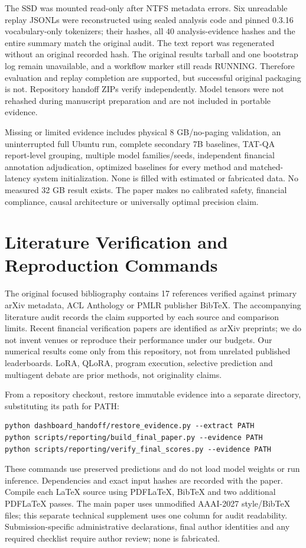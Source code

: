 \documentclass[letterpaper]{article}
\begin{document}
The SSD was mounted read-only after NTFS metadata errors. Six unreadable replay JSONLs were reconstructed using sealed analysis code and pinned 0.3.16 vocabulary-only tokenizers; their hashes, all 40 analysis-evidence hashes and the entire summary match the original audit. The text report was regenerated without an original recorded hash. The original results tarball and one bootstrap log remain unavailable, and a workflow marker still reads RUNNING. Therefore evaluation and replay completion are supported, but successful original packaging is not. Repository handoff ZIPs verify independently. Model tensors were not rehashed during manuscript preparation and are not included in portable evidence.

Missing or limited evidence includes physical 8 GB/no-paging validation, an uninterrupted full Ubuntu run, complete secondary 7B baselines, TAT-QA report-level grouping, multiple model families/seeds, independent financial annotation adjudication, optimized baselines for every method and matched-latency system initialization. None is filled with estimated or fabricated data. No measured 32 GB result exists. The paper makes no calibrated safety, financial compliance, causal architecture or universally optimal precision claim.

\section{Literature Verification and Reproduction Commands}
The original focused bibliography contains 17 references verified against primary arXiv metadata, ACL Anthology or PMLR publisher BibTeX. The accompanying literature audit records the claim supported by each source and comparison limits. Recent financial verification papers are identified as arXiv preprints; we do not invent venues or reproduce their performance under our budgets. Our numerical results come only from this repository, not from unrelated published leaderboards. LoRA, QLoRA, program execution, selective prediction and multiagent debate are prior methods, not originality claims.

From a repository checkout, restore immutable evidence into a separate directory, substituting its path for PATH:
\noindent\begin{minipage}{\textwidth}
\begin{verbatim}
python dashboard_handoff/restore_evidence.py --extract PATH
python scripts/reporting/build_final_paper.py --evidence PATH
python scripts/reporting/verify_final_scores.py --evidence PATH
\end{verbatim}
\end{minipage}
These commands use preserved predictions and do not load model weights or run inference. Dependencies and exact input hashes are recorded with the paper. Compile each LaTeX source using PDFLaTeX, BibTeX and two additional PDFLaTeX passes. The main paper uses unmodified AAAI-2027 style/BibTeX files; this separate technical supplement uses one column for audit readability. Submission-specific administrative declarations, final author identities and any required checklist require author review; none is fabricated.
\end{document}
